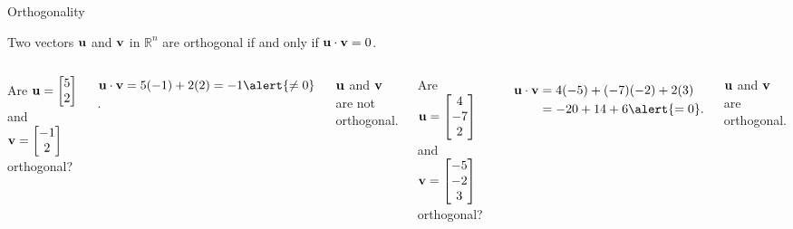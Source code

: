 \documentclass[xcolor=dvipsnames,aspectratio=169,t]{beamer}
\begin{document}
\begin{frame}{Orthogonality}
  \begin{definition}
  Two vectors $\mathbf{u}$ and $\mathbf{v}$ in $\mathbb{R}^n$ are \alert{orthogonal} if and only if \alert{$\mathbf{u} \cdot \mathbf{v} = 0$}.
  \end{definition}
  \medskip
  
  \smallskip
  
  \begin{columns}[T]
  Are $\mathbf{u}=\begin{bmatrix} 5 \\ 2 \end{bmatrix}$ and
      $\mathbf{v}=\begin{bmatrix} -1 \\ 2 \end{bmatrix}$ orthogonal?
  \bigskip
  
  \pause
  \quad $\u \cdot \v = 5(-1) + 2(2) = -1 \alert{\ne 0}$.
  \medskip
  
  $\mathbf{u}$ and $\mathbf{v}$ are \alert{not} orthogonal.
  
  \pause
  Are $\mathbf{u}=\begin{bmatrix} 4 \\ -7 \\ 2 \end{bmatrix}$ and
      $\mathbf{v}=\begin{bmatrix} -5 \\ -2 \\ 3 \end{bmatrix}$ orthogonal?
  
  \pause
  \begin{align*}
    \u \cdot \v &= 4(-5) + (-7)(-2)+ 2(3) \\
     & = -20+14+6 \alert{=0}.
  \end{align*}

  $\mathbf{u}$ and $\mathbf{v}$ are \alert{orthogonal}.
  \end{columns}
\end{frame}
\end{document}
